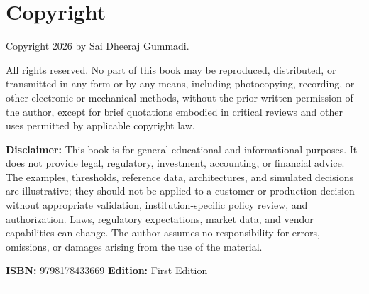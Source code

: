 \chapter*{Copyright}

Copyright \textcopyright{} 2026 by Sai Dheeraj Gummadi.

All rights reserved. No part of this book may be reproduced, distributed, or transmitted in any form or by any means, including photocopying, recording, or other electronic or mechanical methods, without the prior written permission of the author, except for brief quotations embodied in critical reviews and other uses permitted by applicable copyright law.

\textbf{Disclaimer:} This book is for general educational and informational purposes. It does not provide legal, regulatory, investment, accounting, or financial advice. The examples, thresholds, reference data, architectures, and simulated decisions are illustrative; they should not be applied to a customer or production decision without appropriate validation, institution-specific policy review, and authorization. Laws, regulatory expectations, market data, and vendor capabilities can change. The author assumes no responsibility for errors, omissions, or damages arising from the use of the material.

\textbf{ISBN:} 9798178433669 \textbf{Edition:} First Edition

\medskip\hrule\medskip

